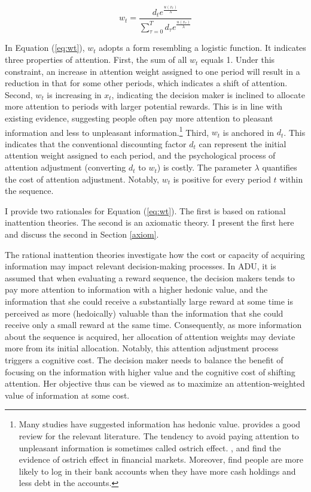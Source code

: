 \documentclass[
  12pt,
]{article}
\begin{document}
\begin{equation}\tag{1}\label{eq:wt}
w_t = \frac{d_t e^{\frac{u(x_t)}{\lambda}}}{\sum_{\tau=0}^T d_\tau e^{\frac{u(x_\tau)}{\lambda}}}
\end{equation}

In Equation (\ref{eq:wt}), \(w_t\) adopts a form resembling a logistic
function. It indicates three properties of attention. First, the sum of
all \(w_t\) equals 1. Under this constraint, an increase in attention
weight assigned to one period will result in a reduction in that for
some other periods, which indicates a shift of attention. Second,
\(w_t\) is increasing in \(x_t\), indicating the decision maker is
inclined to allocate more attention to periods with larger potential
rewards. This is in line with existing evidence, suggesting people often
pay more attention to pleasant information and less to unpleasant
information.\footnote{Many studies have suggested information has
  hedonic value. \citet{golman_information_2017} provides a good review
  for the relevant literature. The tendency to avoid paying attention to
  unpleasant information is sometimes called ostrich effect.
  \citet{galai_ostrich_2006}, \citet{sicherman_financial_2016} and
  \citet{quispe-torreblanca_attention_2022} find the evidence of ostrich
  effect in financial markets. Moreover, \citet{olafsson_ostrich_2017}
  find people are more likely to log in their bank accounts when they
  have more cash holdings and less debt in the accounts.} Third, \(w_t\)
is anchored in \(d_t\). This indicates that the conventional discounting
factor \(d_t\) can represent the initial attention weight assigned to
each period, and the psychological process of attention adjustment
(converting \(d_t\) to \(w_t\)) is costly. The parameter \(\lambda\)
quantifies the cost of attention adjustment. Notably, \(w_t\) is
positive for every period \(t\) within the sequence.

I provide two rationales for Equation (\ref{eq:wt}). The first is based
on rational inattention theories. The second is an axiomatic theory. I
present the first here and discuss the second in Section \ref{axiom}.

The rational inattention theories investigate how the cost or capacity
of acquiring information may impact relevant decision-making processes.
In ADU, it is assumed that when evaluating a reward sequence, the
decision makers tends to pay more attention to information with a higher
hedonic value, and the information that she could receive a
substantially large reward at some time is perceived as more
(hedoically) valuable than the information that she could receive only a
small reward at the same time. Consequently, as more information about
the sequence is acquired, her allocation of attention weights may
deviate more from its initial allocation. Notably, this attention
adjustment process triggers a cognitive cost. The decision maker needs
to balance the benefit of focusing on the information with higher value
and the cognitive cost of shifting attention. Her objective thus can be
viewed as to maximize an attention-weighted value of information at some
cost.
\end{document}
